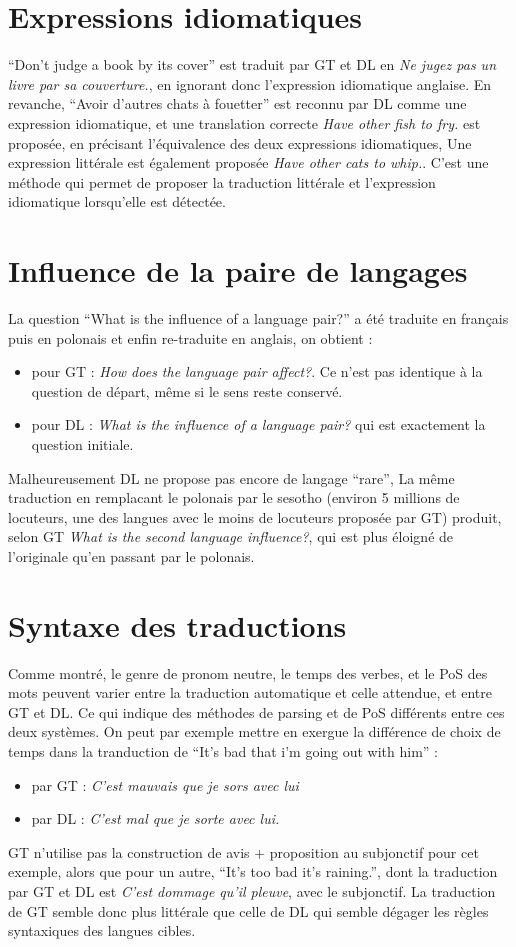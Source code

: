 \documentclass[12pt,a4paper,onecolumn]{article}
\begin{document}
\section{Expressions idiomatiques}
\enquote{Don't judge a book by its cover} est traduit par GT et DL en \textit{Ne jugez pas un livre par sa couverture.}, en ignorant donc l'expression idiomatique anglaise. En revanche, \enquote{Avoir d'autres chats à fouetter} est reconnu par DL comme une expression idiomatique, et une translation correcte \textit{Have other fish to fry.} est proposée, en précisant l'équivalence des deux expressions idiomatiques, Une expression littérale est également proposée \textit{Have other cats to whip.}. C'est une méthode qui permet de proposer la traduction littérale et l'expression idiomatique lorsqu'elle est détectée.


\section{Influence de la paire de langages}
La question \enquote{What is the influence of a language pair?} a été traduite en français puis en polonais et enfin re-traduite en anglais, on obtient :
\begin{itemize}
	\item pour GT : \textit{How does the language pair affect?}. Ce n'est pas identique à la question de départ, même si le sens reste conservé.
	\item pour DL : \textit{What is the influence of a language pair?} qui est exactement la question initiale.
\end{itemize}
Malheureusement DL ne propose pas encore de langage \enquote{rare}, La même traduction en remplacant le polonais par le sesotho (environ 5 millions de locuteurs, une des langues avec le moins de locuteurs proposée par GT) produit, selon GT \textit{What is the second language influence?}, qui est plus éloigné de l'originale qu'en passant par le polonais.

\section{Syntaxe des traductions}
Comme montré, le genre de pronom neutre, le temps des verbes, et le PoS des mots peuvent varier entre la traduction automatique et celle attendue, et entre GT et DL. Ce qui indique des méthodes de parsing et de PoS différents entre ces deux systèmes. On peut par exemple mettre en exergue la différence de choix de temps dans la tranduction de \enquote{It's bad that i'm going out with him} :
\begin{itemize}
	\item par GT : \textit{C'est mauvais que je sors avec lui}
	\item par DL : \textit{C'est mal que je sorte avec lui.}
\end{itemize}
GT n'utilise pas la construction de avis + proposition au subjonctif pour cet exemple, alors que pour un autre, \enquote{It's too bad it's raining.}, dont la traduction par GT et DL est \textit{C'est dommage qu'il pleuve}, avec le subjonctif. La traduction de GT semble donc plus littérale que celle de DL qui semble dégager les règles syntaxiques des langues cibles.
\end{document}
